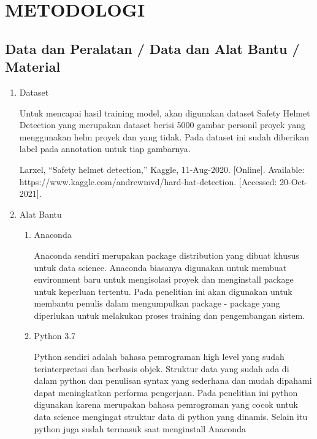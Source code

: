 \chapter{METODOLOGI}
\label{chap:desainimplementasi}



\section{Data dan Peralatan / Data dan Alat Bantu / Material}
\label{sec:perlengkapan}


\begin{enumerate}
  \item Dataset
  \par Untuk mencapai hasil training model, akan digunakan dataset Safety Helmet Detection yang merupakan dataset berisi 5000 gambar personil proyek yang menggunakan helm proyek dan yang tidak. Pada dataset ini sudah diberikan label pada annotation untuk tiap gambarnya. \cite{larxel_2020}
  \par Larxel, “Safety helmet detection,” Kaggle, 11-Aug-2020. [Online]. Available: https://www.kaggle.com/andrewmvd/hard-hat-detection. [Accessed: 20-Oct-2021].

  \item Alat Bantu
  \begin{enumerate}
    \item Anaconda
    \par Anaconda sendiri merupakan package distribution yang dibuat khusus untuk data science. Anaconda biasanya digunakan untuk membuat environment baru untuk mengisolasi proyek dan menginstall package untuk keperluan tertentu. Pada penelitian ini akan digunakan untuk membantu penulis dalam mengumpulkan package - package yang diperlukan untuk melakukan proses training dan pengembangan sistem.\cite{pankajmathur_2018}

    \item Python 3.7
    \par Python sendiri adalah bahasa pemrograman high level yang sudah terinterpretasi dan berbasis objek. Struktur data yang sudah ada di dalam python dan penulisan syntax yang sederhana dan mudah dipahami dapat meningkatkan performa pengerjaan. Pada penelitian ini python digunakan karena merupakan bahasa pemrograman yang cocok untuk data science mengingat struktur data di python yang dinamis. Selain itu python juga sudah termasuk saat menginstall Anaconda \cite{python.org}


\end{enumerate}
\end{enumerate}
